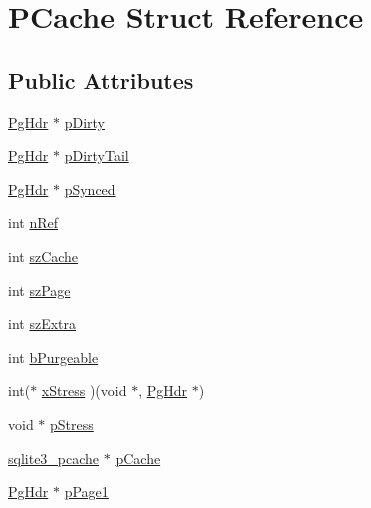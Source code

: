 \hypertarget{struct_p_cache}{\section{P\-Cache Struct Reference}
\label{struct_p_cache}
}
\subsection*{Public Attributes}
\begin{DoxyCompactItemize}
\item 
\hyperlink{struct_pg_hdr}{Pg\-Hdr} $\ast$ \hyperlink{struct_p_cache_a1c692ce92c7d3fc7c6c1324d5658b252}{p\-Dirty}
\item 
\hyperlink{struct_pg_hdr}{Pg\-Hdr} $\ast$ \hyperlink{struct_p_cache_a8eaca309bfb8fa49e7c5e77dd3398bb0}{p\-Dirty\-Tail}
\item 
\hyperlink{struct_pg_hdr}{Pg\-Hdr} $\ast$ \hyperlink{struct_p_cache_a607eabd6768dd8df47d8fa353542b106}{p\-Synced}
\item 
int \hyperlink{struct_p_cache_a8270710a90112645a69cea03ab5a2d25}{n\-Ref}
\item 
int \hyperlink{struct_p_cache_a93ed4b9d731d883c3ed22a5adfd9c636}{sz\-Cache}
\item 
int \hyperlink{struct_p_cache_abb0bd0a3292780dcc07cb59bc577990d}{sz\-Page}
\item 
int \hyperlink{struct_p_cache_abcb37fcd3ea098b98a196a3f69e3c135}{sz\-Extra}
\item 
int \hyperlink{struct_p_cache_a6dbb1820ecbfb378841ee81186ea5902}{b\-Purgeable}
\item 
int($\ast$ \hyperlink{struct_p_cache_a8b177ebb03aaf4774b6137d48733eeb5}{x\-Stress} )(void $\ast$, \hyperlink{struct_pg_hdr}{Pg\-Hdr} $\ast$)
\item 
void $\ast$ \hyperlink{struct_p_cache_af04a2ea8a2c6d6b3eea7bb7051b8f447}{p\-Stress}
\item 
\hyperlink{sqlite3_8c_a096c453d937d51f7926d7d31c8e0bd2f}{sqlite3\-\_\-pcache} $\ast$ \hyperlink{struct_p_cache_ad0248655d30d327e0eeced6c3651b161}{p\-Cache}
\item 
\hyperlink{struct_pg_hdr}{Pg\-Hdr} $\ast$ \hyperlink{struct_p_cache_a190ece57aafde4310e424f82998776cb}{p\-Page1}
\end{DoxyCompactItemize}


